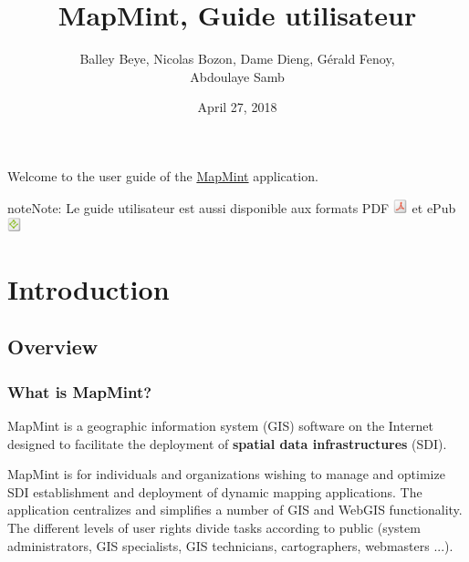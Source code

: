 \documentclass[letterpaper,10pt,english]{sphinxmanual}
\title{MapMint, Guide utilisateur}
\date{April 27, 2018}
\author{Balley Beye, Nicolas Bozon, Dame Dieng, Gérald Fenoy, \\Abdoulaye Samb}
\begin{document}
\maketitle
\tableofcontents
{}\label{index::doc}


Welcome to the user guide of the \href{http://mapmint.com}{MapMint} application.

\begin{notice}{note}{Note:}
Le guide utilisateur est aussi disponible aux formats
PDF \includegraphics{pdf.png}  et ePub \includegraphics{epub.png}
\end{notice}


\chapter{Introduction}
\label{introduction/index:table-des-matieres}\label{introduction/index:home}\label{introduction/index::doc}\label{introduction/index:dashboard}\label{introduction/index:introduction}

\section{Overview}
\label{introduction/introduction:generalites}\label{introduction/introduction::doc}\label{introduction/introduction:userguidegeneral}

\subsection{What is MapMint?}
\label{introduction/introduction:quest-ce-que-mapmint}
MapMint is a geographic information system (GIS) software on the Internet designed to facilitate the deployment of  \textbf{spatial data infrastructures} (SDI).

MapMint is for individuals and organizations wishing to manage and optimize SDI establishment and deployment of dynamic mapping applications. The application centralizes and simplifies a number of GIS and WebGIS functionality. The different levels of user rights divide tasks according to public (system administrators, GIS specialists, GIS technicians, cartographers, webmasters ...).
\end{document}
